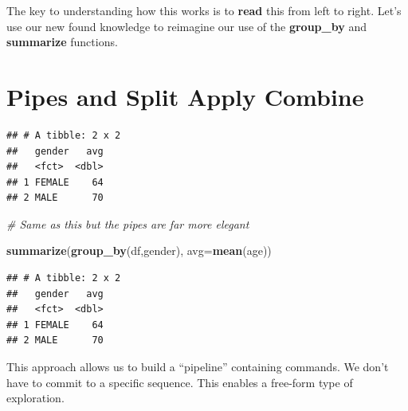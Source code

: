 \documentclass[]{book}
\newenvironment{Shaded}{\begin{snugshade}}{\end{snugshade}}
\newcommand{\CommentTok}[1]{\textcolor[rgb]{0.56,0.35,0.01}{\textit{#1}}}
\newcommand{\DataTypeTok}[1]{\textcolor[rgb]{0.13,0.29,0.53}{#1}}
\newcommand{\KeywordTok}[1]{\textcolor[rgb]{0.13,0.29,0.53}{\textbf{#1}}}
\newcommand{\NormalTok}[1]{#1}
\newcommand{\OperatorTok}[1]{\textcolor[rgb]{0.81,0.36,0.00}{\textbf{#1}}}
\newcommand{\StringTok}[1]{\textcolor[rgb]{0.31,0.60,0.02}{#1}}
\begin{document}
The key to understanding how this works is to \textbf{read} this from left to right. Let's use our new found knowledge to reimagine our use of the \textbf{group\_by} and \textbf{summarize} functions.

\hypertarget{pipes-and-split-apply-combine}{%
\section{Pipes and Split Apply Combine}\label{pipes-and-split-apply-combine}}

\begin{Shaded}
\end{Shaded}

\begin{verbatim}
## # A tibble: 2 x 2
##   gender   avg
##   <fct>  <dbl>
## 1 FEMALE    64
## 2 MALE      70
\end{verbatim}

\begin{Shaded}
\begin{Highlighting}[]
\CommentTok{# Same as this but the pipes are far more elegant}

\KeywordTok{summarize}\NormalTok{(}\KeywordTok{group_by}\NormalTok{(df,gender), }\DataTypeTok{avg=}\KeywordTok{mean}\NormalTok{(age))}
\end{Highlighting}
\end{Shaded}

\begin{verbatim}
## # A tibble: 2 x 2
##   gender   avg
##   <fct>  <dbl>
## 1 FEMALE    64
## 2 MALE      70
\end{verbatim}

This approach allows us to build a ``pipeline'' containing commands. We don't have to commit to a specific sequence. This enables a free-form type of exploration.

\begin{Shaded}
\end{Shaded}
\end{document}
